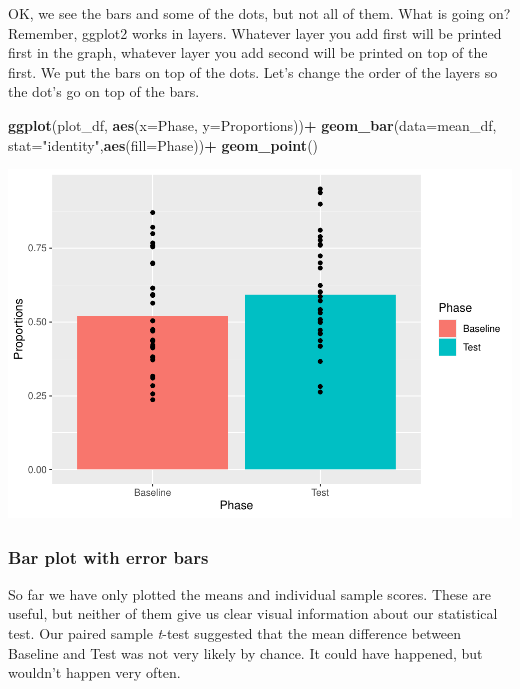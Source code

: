 \documentclass[
]{book}
\newenvironment{Shaded}{\begin{snugshade}}{\end{snugshade}}
\newcommand{\AttributeTok}[1]{\textcolor[rgb]{0.13,0.29,0.53}{#1}}
\newcommand{\FunctionTok}[1]{\textcolor[rgb]{0.13,0.29,0.53}{\textbf{#1}}}
\newcommand{\NormalTok}[1]{#1}
\newcommand{\SpecialCharTok}[1]{\textcolor[rgb]{0.81,0.36,0.00}{\textbf{#1}}}
\newcommand{\StringTok}[1]{\textcolor[rgb]{0.31,0.60,0.02}{#1}}
\begin{document}
OK, we see the bars and some of the dots, but not all of them. What is going on? Remember, ggplot2 works in layers. Whatever layer you add first will be printed first in the graph, whatever layer you add second will be printed on top of the first. We put the bars on top of the dots. Let's change the order of the layers so the dot's go on top of the bars.

\begin{Shaded}
\begin{Highlighting}[]
\FunctionTok{ggplot}\NormalTok{(plot\_df, }\FunctionTok{aes}\NormalTok{(}\AttributeTok{x=}\NormalTok{Phase, }\AttributeTok{y=}\NormalTok{Proportions))}\SpecialCharTok{+} 
  \FunctionTok{geom\_bar}\NormalTok{(}\AttributeTok{data=}\NormalTok{mean\_df, }\AttributeTok{stat=}\StringTok{"identity"}\NormalTok{,}\FunctionTok{aes}\NormalTok{(}\AttributeTok{fill=}\NormalTok{Phase))}\SpecialCharTok{+}
  \FunctionTok{geom\_point}\NormalTok{()}
\end{Highlighting}
\end{Shaded}

\includegraphics{Statistics_Lab_files/figure-latex/unnamed-chunk-178-1.pdf}

\hypertarget{bar-plot-with-error-bars}{%
\subsubsection{Bar plot with error bars}\label{bar-plot-with-error-bars}}

So far we have only plotted the means and individual sample scores. These are useful, but neither of them give us clear visual information about our statistical test. Our paired sample \emph{t}-test suggested that the mean difference between Baseline and Test was not very likely by chance. It could have happened, but wouldn't happen very often.
\end{document}
